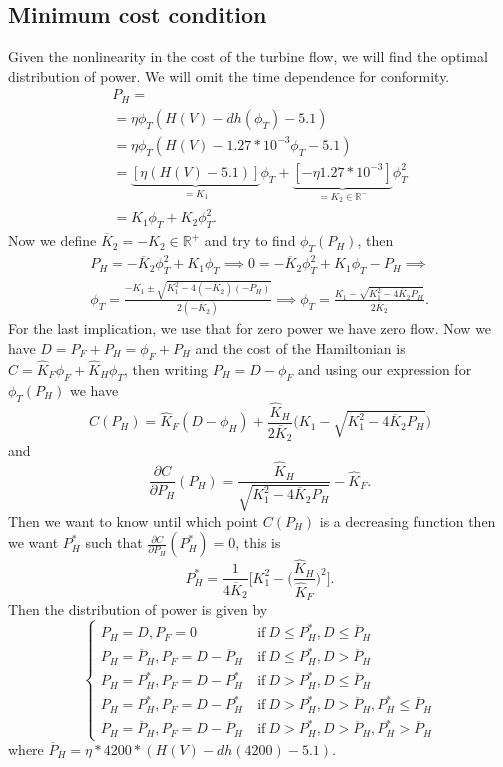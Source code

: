 \documentclass[12pt]{article}
\theoremstyle{definition}
\theoremstyle{remark}
\newcommand{\R}{\mathbb{R}}
\begin{document}
\subsection{Minimum cost condition}

Given the nonlinearity in the cost of the turbine flow, we will find the optimal distribution of power. We will omit the time dependence for conformity.
\begin{multline*}
P_H=\\
=\eta\phi_T(H(V)-dh(\phi_T)-5.1)\\
=\eta\phi_T(H(V)-1.27*10^{-3}\phi_T-5.1)\\
=\underbrace{[\eta(H(V)-5.1)]}_{=K_1}\phi_T+\underbrace{[-\eta1.27*10^{-3}]}_{=K_2\in\R^-}\phi_T^2\\
=K_1\phi_T+K_2\phi_T^2.
\end{multline*}
Now we define $\overline{K}_2=-K_2\in\R^+$ and try to find $\phi_T(P_H)$, then
\begin{multline*}
P_H=-\overline{K}_2\phi_T^2+K_1\phi_T\implies0=-\overline{K}_2\phi_T^2+K_1\phi_T-P_H\implies\\
\phi_T=\frac{-K_1\pm\sqrt{K_1^2-4(-\overline{K}_2)(-P_H)}}{2(-\overline{K}_2)}\implies
\phi_T=\frac{K_1-\sqrt{K_1^2-4\overline{K}_2P_H}}{2\overline{K}_2}.
\end{multline*}
For the last implication, we use that for zero power we have zero flow. Now we have $D=P_F+P_H=\phi_F+P_H$ and the cost of the Hamiltonian is $C=\hat{K}_F\phi_F+\hat{K}_H\phi_T$, then writing $P_H=D-\phi_F$ and using our expression for $\phi_T(P_H)$ we have
\begin{equation*}
C(P_H)=\hat{K}_F(D-\phi_H)+\frac{\hat{K}_H}{2\overline{K}_2}\Bigg(K_1-\sqrt{K_1^2-4\overline{K}_2P_H}\Bigg)
\end{equation*}
and
\begin{equation*}
\frac{\partial C}{\partial P_H}(P_H)=\frac{\hat{K}_H}{\sqrt{K_1^2-4\overline{K}_2P_H}}-\hat{K}_F.
\end{equation*}
Then we want to know until which point $C(P_H)$ is a decreasing function then we want $P_H^*$ such that $\frac{\partial C}{\partial P_H}(P_H^*)=0$, this is
\begin{equation*}
P_H^*=\frac{1}{4\overline{K}_2}\Bigg[K_1^2-\Bigg(\frac{\hat{K}_H}{\hat{K}_F}\Bigg)^2\Bigg].
\end{equation*}
Then the distribution of power is given by
\begin{equation*}
\begin{cases}
P_H=D,P_F=0\ &\text{if}\ D\leq P_H^*,D\leq\overline{P}_H\\
P_H=\overline{P}_H,P_F=D-\overline{P}_H\ &\text{if}\ D\leq P_H^*,D>\overline{P}_H\\
P_H=P_H^*,P_F=D-P_H^*\ &\text{if}\ D>P_H^*,D\leq\overline{P}_H\\
P_H=P_H^*,P_F=D-P_H^*\ &\text{if}\ D>P_H^*,D>\overline{P}_H,P_H^*\leq\overline{P}_H\\
P_H=\overline{P}_H,P_F=D-\overline{P}_H\ &\text{if}\ D>P_H^*,D>\overline{P}_H,P_H^*>\overline{P}_H
\end{cases}
\end{equation*}
where $\overline{P}_H=\eta*4200*(H(V)-dh(4200)-5.1)$.
\end{document}
